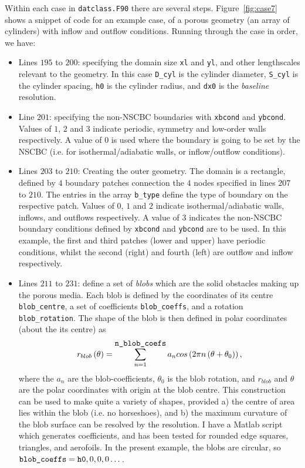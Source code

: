 \documentclass[notitlepage]{revtex4-1}
\begin{document}
Within each case in \verb|datclass.F90| there are several steps. Figure~\ref{fig:case7} shows a snippet of code for an example case, of a porous geometry (an array of cylinders) with inflow and outflow conditions. Running through the case in order, we have:
\begin{itemize}
\item Lines $195$ to $200$: specifying the domain size \verb|xl| and \verb|yl|, and other lengthscales relevant to the geometry. In this case \verb|D_cyl| is the cylinder diameter, \verb|S_cyl| is the cylinder spacing, \verb|h0| is the cylinder radius, and \verb|dx0| is the \emph{baseline} resolution.
\item Line $201$: specifying the non-NSCBC boundaries with \verb|xbcond| and \verb|ybcond|. Values of $1$, $2$ and $3$ indicate periodic, symmetry and low-order walls respectively. A value of $0$ is used where the boundary is going to be set by the NSCBC (i.e. for isothermal/adiabatic walls, or inflow/outflow conditions).
\item Lines $203$ to $210$: Creating the outer geometry. The domain is a rectangle, defined by $4$ boundary patches connection the $4$ nodes specified in lines $207$ to $210$. The entries in the array \verb|b_type| define the type of boundary on the respective patch. Values of $0$, $1$ and $2$ indicate isothermal/adiabatic walls, inflows, and outflows respectively. A value of $3$ indicates the non-NSCBC boundary conditions defined by \verb|xbcond| and \verb|ybcond| are to be used. In this example, the first and third patches (lower and upper) have periodic conditions, whilst the second (right) and fourth (left) are outflow and inflow respectively.
\item Lines $211$ to $231$: define a set of \emph{blobs} which are the solid obstacles making up the porous media. Each blob is defined by the coordinates of its centre \verb|blob_centre|, a set of coefficients \verb|blob_coeffs|, and a rotation \verb|blob_rotation|. The shape of the blob is then defined in polar coordinates (about the its centre) as
\begin{equation}r_{blob}\left(\theta\right)=\displaystyle\sum_{n=1}^{\verb|n_blob_coefs|}a_{n}cos\left(2\pi{n}\left(\theta+\theta_{0}\right)\right),\end{equation}
where the $a_{n}$ are the blob-coefficients, $\theta_{0}$ is the blob rotation, and $r_{blob}$ and $\theta$ are the polar coordinates with origin at the blob centre. This construction can be used to make quite a variety of shapes, provided a) the centre of area lies within the blob (i.e. no horseshoes), and b) the maximum curvature of the blob surface can be resolved by the resolution. I have a Matlab script which generates coefficients, and has been tested for rounded edge squares, triangles, and aerofoils. In the present example, the blobs are circular, so $\verb|blob_coeffs|=\verb|h0|,0,0,0\dots$.

\end{itemize}
\end{document}
